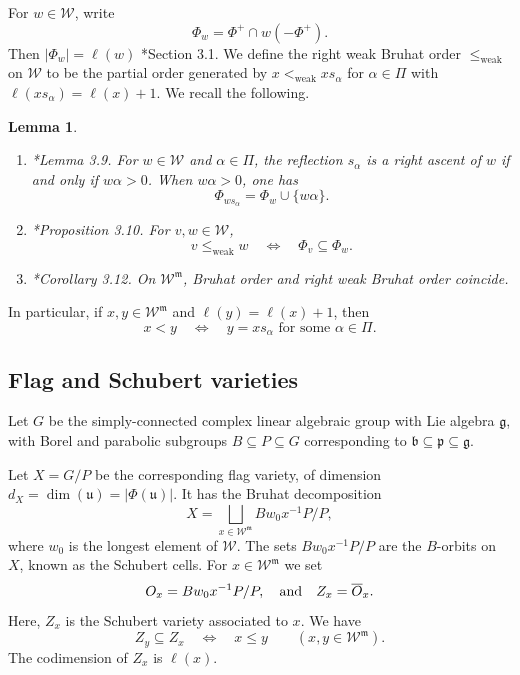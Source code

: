 \documentclass[12pt]{amsart}
\newtheorem{lemma}[theorem]{Lemma}
\theoremstyle{definition}
\numberwithin{equation}{section}
\newcommand{\g}{\mathfrak g}
\newcommand{\m}{\mathfrak m}
\newcommand{\W}{\mathscr W}
\begin{document}
For $w\in\W$, write
\begin{equation}\label{eq:root-inversion-ideal}
 \Phi_w=\Phi^+\cap w(-\Phi^+).
\end{equation}
Then $|\Phi_w|=\ell(w)$ \cite{EHP}*{Section 3.1}.
We define the right weak Bruhat order $\leq_{\mathrm{weak}}$ on $\W$ to be the partial order generated by
$x<_{\mathrm{weak}}xs_\alpha$ for $\alpha\in\Pi$ with
$\ell(xs_\alpha)=\ell(x)+1$. We recall the following.

\begin{lemma}
\label{lem:root-bruhat-ideals}
\begin{enumerate}
\renewcommand{\labelenumi}{(\roman{enumi})}
\item \textup{\cite{EHP}*{Lemma 3.9}.}
For $w\in\W$ and $\alpha\in\Pi$, the reflection
$s_\alpha$ is a right ascent of $w$ if and only if $w\alpha>0$.
When $w\alpha>0$, one has
\begin{equation}\label{eq:root-cover-ideal}
 \Phi_{ws_\alpha}=\Phi_w\cup\{w\alpha\}.
\end{equation}
\item \textup{\cite{EHP}*{Proposition 3.10}.}
For $v,w\in\W$,
\[
 v\leq_{\mathrm{weak}}w
 \quad\Longleftrightarrow\quad\Phi_v\subseteq\Phi_w.
\]
\item \textup{\cite{EHP}*{Corollary 3.12}.}
On $\W^{\m}$, Bruhat order and right weak Bruhat order coincide.
\end{enumerate}
\end{lemma}

\noindent In particular, if $x,y\in\W^{\m}$ and
$\ell(y)=\ell(x)+1$, then
\[
x<y\quad\Longleftrightarrow\quad
y=xs_\alpha\text{ for some }\alpha\in\Pi.
\]


\subsection{Flag and Schubert varieties} Let $G$ be the simply-connected complex linear algebraic group with Lie algebra $\g$, with Borel and parabolic subgroups $B\subseteq P\subseteq G$ corresponding to $\mathfrak{b}\subseteq \mathfrak{p}\subseteq \g$.

Let $X=G/P$ be the corresponding flag variety, of dimension $d_X=\dim(\mathfrak{u})=|\Phi(\mathfrak{u})|$. It has the Bruhat decomposition 
\begin{equation}
X=\bigsqcup_{x\in \W^{\m}} Bw_0x^{-1}P/P,
\end{equation}
where $w_0$ is the longest element of $\W$. The sets $Bw_0x^{-1}P/P$ are the $B$-orbits on $X$, known as the Schubert cells. For $x\in \W^{\m}$ we set
\begin{equation}
O_x=Bw_0x^{-1}P/P,\quad \textnormal{and}\quad Z_x=\overline{O}_x.    
\end{equation}
Here, $Z_x$ is the Schubert variety associated to $x$. We have
\[
Z_y\subseteq Z_x\quad\Longleftrightarrow\quad x\leq y
\qquad(x,y\in\W^{\m}).
\]
The codimension of $Z_x$ is $\ell(x)$.
\end{document}

